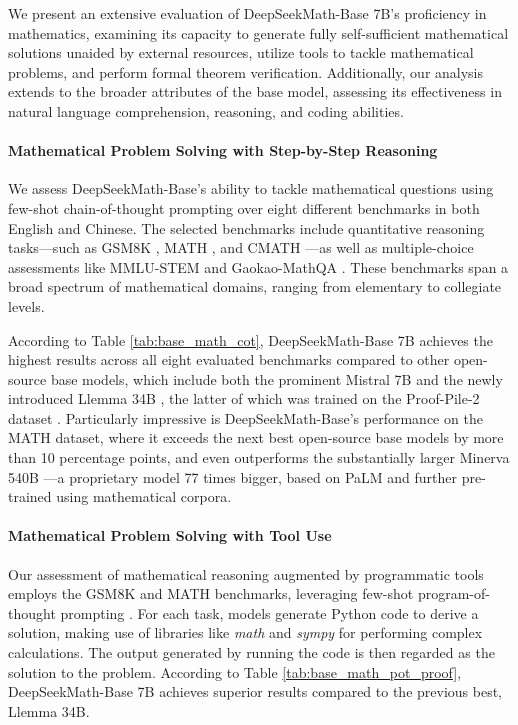 \begin{itemize}[topsep=0pt]
We present an extensive evaluation of DeepSeekMath-Base 7B’s proficiency in mathematics, examining its capacity to generate fully self-sufficient mathematical solutions unaided by external resources, utilize tools to tackle mathematical problems, and perform formal theorem verification. Additionally, our analysis extends to the broader attributes of the base model, assessing its effectiveness in natural language comprehension, reasoning, and coding abilities.

\paragraph{Mathematical Problem Solving with Step-by-Step Reasoning}

We assess DeepSeekMath-Base's ability to tackle mathematical questions using few-shot chain-of-thought prompting \citep{cot} over eight different benchmarks in both English and Chinese. The selected benchmarks include quantitative reasoning tasks—such as GSM8K \citep{gsm8k}, MATH \citep{MATH}, and CMATH \citep{wei2023cmath}—as well as multiple-choice assessments like MMLU-STEM \citep{mmlu} and Gaokao-MathQA \citep{agieval}. These benchmarks span a broad spectrum of mathematical domains, ranging from elementary to collegiate levels.

According to Table \ref{tab:base_math_cot}, DeepSeekMath-Base 7B achieves the highest results across all eight evaluated benchmarks compared to other open-source base models, which include both the prominent Mistral 7B \citep{mistral} and the newly introduced Llemma 34B \citep{llemma}, the latter of which was trained on the Proof-Pile-2 dataset \citep{llemma}. Particularly impressive is DeepSeekMath-Base’s performance on the MATH dataset, where it exceeds the next best open-source base models by more than 10 percentage points, and even outperforms the substantially larger Minerva 540B \citep{minerva}—a proprietary model 77 times bigger, based on PaLM \citep{palm} and further pre-trained using mathematical corpora.

\paragraph{Mathematical Problem Solving with Tool Use} Our assessment of mathematical reasoning augmented by programmatic tools employs the GSM8K and MATH benchmarks, leveraging few-shot program-of-thought prompting \citep{pot,pal}. For each task, models generate Python code to derive a solution, making use of libraries like \textit{math} and \textit{sympy} for performing complex calculations. The output generated by running the code is then regarded as the solution to the problem. According to Table \ref{tab:base_math_pot_proof}, DeepSeekMath-Base 7B achieves superior results compared to the previous best, Llemma 34B.


\end{itemize}
